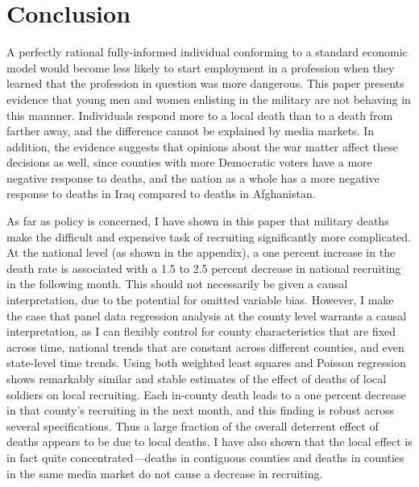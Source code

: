 \documentclass[12pt] {article}
\begin{document}
\section{Conclusion}\label{sec:Conclusion}


A perfectly rational fully-informed individual conforming to a standard economic model would become less likely to start employment in a profession when they learned that the profession in question was more dangerous. This paper presents evidence that young men and women enlisting in the military are not behaving in this mannner. Individuals respond more to a local death than to a death from farther away, and the difference cannot be explained by media markets. In addition, the evidence suggests that opinions about the war matter affect these decisions as well, since counties with more Democratic voters have a more negative response to deaths, and the nation as a whole has a more negative response to deaths in Iraq compared to deaths in Afghanistan. 

  As far as policy is concerned, I have shown in this paper that military deaths make the difficult and expensive task of recruiting significantly
more complicated. At the national level (as shown in the appendix), a one percent increase in
the death rate is associated with a 1.5 to 2.5 percent decrease in
national recruiting in the following month. This should not necessarily
be given a causal interpretation, due to the potential for omitted
variable bias. However, I make the case that panel data regression
analysis at the county level warrants a causal interpretation, as
I can flexibly control for county characteristics that are fixed across
time, national trends that are constant across different counties,
and even state-level time trends. Using both weighted least squares
and Poisson regression shows remarkably similar and stable estimates
of the effect of deaths of local soldiers on local recruiting. Each
in-county death leads to a one percent decrease in that county's recruiting
in the next month, and this finding is robust across several specifications.
Thus a large fraction of the overall deterrent effect of deaths appears
to be due to local deaths. I have also shown that the local effect
is in fact quite concentrated---deaths in contiguous counties and
deaths in counties in the same media market do not cause a decrease
in recruiting.
\end{document}
